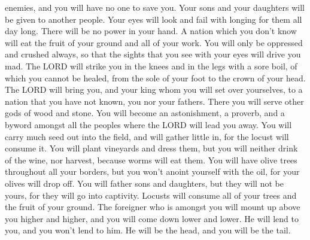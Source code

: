 enemies, and you will have no one to save you.  Your sons
and your daughters will be given to another people. Your eyes will look
and fail with longing for them all day long. There will be no power in
your hand.  A nation which you don't know will eat the
fruit of your ground and all of your work. You will only be oppressed
and crushed always,  so that the sights that you see with
your eyes will drive you mad.  The LORD will strike you
in the knees and in the legs with a sore boil, of which you cannot be
healed, from the sole of your foot to the crown of your head.
 The LORD will bring you, and your king whom you will set
over yourselves, to a nation that you have not known, you nor your
fathers. There you will serve other gods of wood and stone.
 You will become an astonishment, a proverb, and a byword
amongst all the peoples where the LORD will lead you away.
 You will carry much seed out into the field, and will
gather little in, for the locust will consume it.  You
will plant vineyards and dress them, but you will neither drink of the
wine, nor harvest, because worms will eat them.  You will
have olive trees throughout all your borders, but you won't anoint
yourself with the oil, for your olives will drop off. 
You will father sons and daughters, but they will not be yours, for they
will go into captivity.  Locusts will consume all of your
trees and the fruit of your ground.  The foreigner who is
amongst you will mount up above you higher and higher, and you will come
down lower and lower.  He will lend to you, and you won't
lend to him. He will be the head, and you will be the tail.

